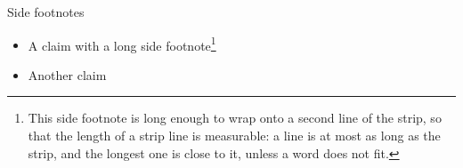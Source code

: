 \sidefootnotes
\begin{standardframe}{Side footnotes}
	\begin{itemize}
		\item A claim with a long side footnote\footnote{This side footnote is long enough to wrap onto a second line of the strip, so that the length of a strip line is measurable: a line is at most as long as the strip, and the longest one is close to it, unless a word does not fit.}
		\item Another claim
	\end{itemize}
\end{standardframe}
